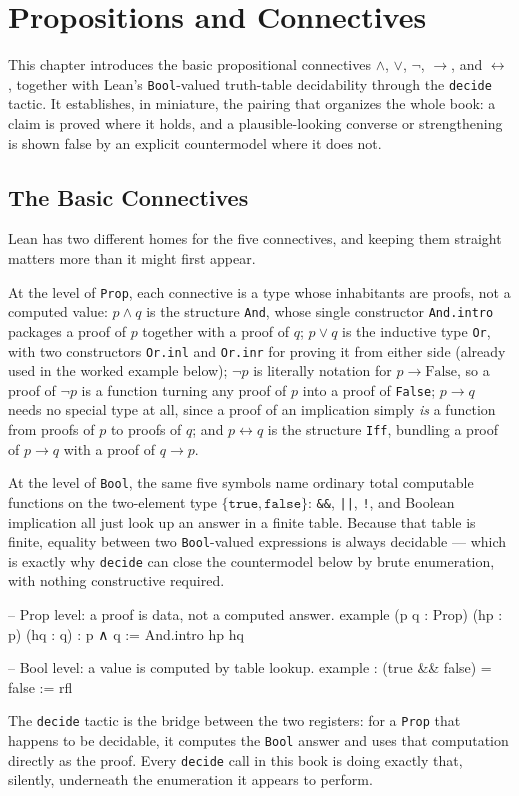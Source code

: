 \chapter{Propositions and Connectives}
\label{ch:propositions}

This chapter introduces the basic propositional connectives
$\land$, $\lor$, $\lnot$, $\to$, and $\leftrightarrow$, together with
Lean's \texttt{Bool}-valued truth-table decidability through the
\texttt{decide} tactic. It establishes, in miniature, the pairing
that organizes the whole book: a claim is proved where it holds, and
a plausible-looking converse or strengthening is shown false by an
explicit countermodel where it does not.

\section{The Basic Connectives}

Lean has two different homes for the five connectives, and keeping
them straight matters more than it might first appear.

At the level of \texttt{Prop}, each connective is a type whose
inhabitants are proofs, not a computed value: $p \land q$ is the
structure \texttt{And}, whose single constructor
\texttt{And.intro} packages a proof of $p$ together with a proof of
$q$; $p \lor q$ is the inductive type \texttt{Or}, with two
constructors \texttt{Or.inl} and \texttt{Or.inr} for proving it from
either side (already used in the worked example below); $\lnot p$ is
literally notation for $p \to \mathrm{False}$, so a proof of
$\lnot p$ is a function turning any proof of $p$ into a proof of
\texttt{False}; $p \to q$ needs no special type at all, since a proof
of an implication simply \emph{is} a function from proofs of $p$ to
proofs of $q$; and $p \leftrightarrow q$ is the structure
\texttt{Iff}, bundling a proof of $p \to q$ with a proof of
$q \to p$.

At the level of \texttt{Bool}, the same five symbols name ordinary
total computable functions on the two-element type
$\{\mathtt{true}, \mathtt{false}\}$: \texttt{\&\&}, \texttt{||},
\texttt{!}, and Boolean implication all just look up an answer in a
finite table. Because that table is finite, equality between two
\texttt{Bool}-valued expressions is always decidable — which is
exactly why \texttt{decide} can close the countermodel below by
brute enumeration, with nothing constructive required.
\begin{lean}
-- Prop level: a proof is data, not a computed answer.
example (p q : Prop) (hp : p) (hq : q) : p ∧ q := And.intro hp hq

-- Bool level: a value is computed by table lookup.
example : (true && false) = false := rfl
\end{lean}
The \texttt{decide} tactic is the bridge between the two registers:
for a \texttt{Prop} that happens to be decidable, it computes the
\texttt{Bool} answer and uses that computation directly as the
proof. Every \texttt{decide} call in this book is doing exactly
that, silently, underneath the enumeration it appears to perform.

